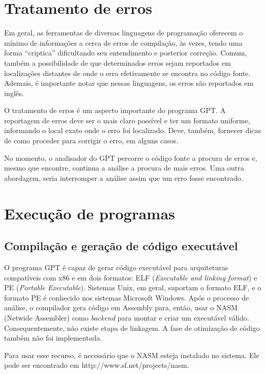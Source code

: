 \documentclass[a4paper,11pt]{report}
\begin{document}
\section{Tratamento de erros}

Em geral, as ferramentas de diversas linguagens de programação oferecem o mínimo
de informações a cerca de erros de compilação, às vezes, tendo uma forma
``criptica'' dificultando seu entendimento e posterior correção. Comum, também a
possibilidade de que determinados erros sejam reportados em localizações
distantes de onde o erro efetivamente se encontra no código fonte. Ademais, é
importante notar que nessas linguagens, os erros são reportados em inglês.

O tratamento de erros é um aspecto importante do programa GPT. A reportagem de
erros deve ser o mais claro possível e ter um formato uniforme, informando o
local exato onde o erro foi localizado. Deve, também, fornecer dicas de como
proceder para corrigir o erro, em alguns casos.

No momento, o analisador do GPT percorre o código fonte a procura de erros e,
mesmo que encontre, continua a análise a procura de mais erros. Uma outra
abordagem, seria interromper a análise assim que um erro fosse encontrado.

\section{Execução de programas}

\subsection{Compilação e geração de código executável}

O programa GPT é capaz de gerar código executável para arquiteturas compatíveis
com x86 e em dois formatos: ELF (\textit{Executable and linking format}) e PE
(\textit{Portable Executable}). Sistemas Unix, em geral, suportam o formato ELF,
e o formato PE é conhecido nos sistemas Microsoft Windows. Após o processo de
análise, o compilador gera código em Assembly para, então, usar o NASM (Netwide
Assembler) como \textit{backend} para montar e criar um executável válido.
Consequentemente, não existe etapa de linkagem. A fase de otimização de código
também não foi implementada.

Para usar esse recurso, é necessário que o NASM esteja instalado no sistema. Ele
pode ser encontrado em http://www.sf.net/projects/nasm.
\end{document}
